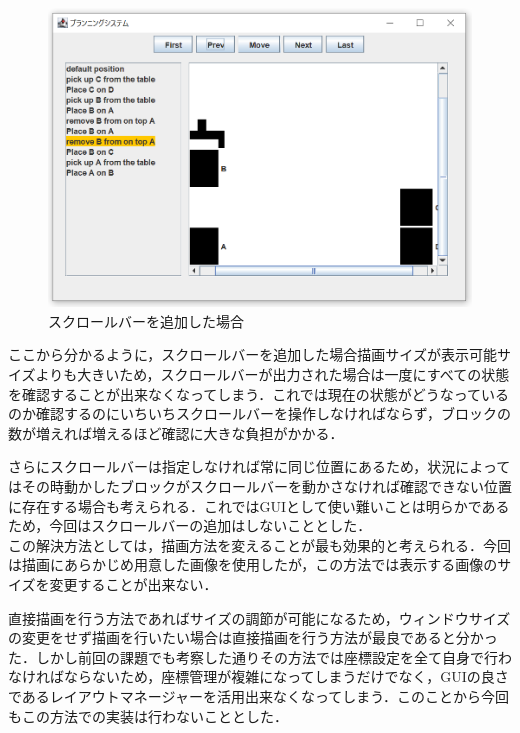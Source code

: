 \documentclass[12pt]{jarticle}
\begin{document}
\begin{figure}[htbp]
  \begin{center}
    \includegraphics[scale=0.8]{images/tryScroll.PNG}
    \caption{スクロールバーを追加した場合}
    \label{fig:tryScroll}
  \end{center}
\end{figure}


ここから分かるように，スクロールバーを追加した場合描画サイズが表示可能サイズよりも大きいため，スクロールバーが出力された場合は一度にすべての状態を確認することが出来なくなってしまう．これでは現在の状態がどうなっているのか確認するのにいちいちスクロールバーを操作しなければならず，ブロックの数が増えれば増えるほど確認に大きな負担がかかる．\par
さらにスクロールバーは指定しなければ常に同じ位置にあるため，状況によってはその時動かしたブロックがスクロールバーを動かさなければ確認できない位置に存在する場合も考えられる．これではGUIとして使い難いことは明らかであるため，今回はスクロールバーの追加はしないこととした．\\

この解決方法としては，描画方法を変えることが最も効果的と考えられる．今回は描画にあらかじめ用意した画像を使用したが，この方法では表示する画像のサイズを変更することが出来ない．\par
直接描画を行う方法であればサイズの調節が可能になるため，ウィンドウサイズの変更をせず描画を行いたい場合は直接描画を行う方法が最良であると分かった．しかし前回の課題でも考察した通りその方法では座標設定を全て自身で行わなければならないため，座標管理が複雑になってしまうだけでなく，GUIの良さであるレイアウトマネージャーを活用出来なくなってしまう．このことから今回もこの方法での実装は行わないこととした．\\
\end{document}

